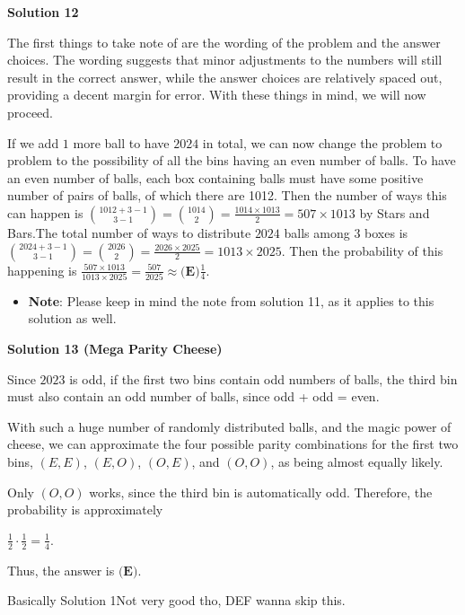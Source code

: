 \begin{enumerate}
 



\textbf{Solution 12}

The first things to take note of are the wording of the problem and the answer choices. The wording suggests that minor adjustments to the numbers will still result in the correct answer, while the answer choices are relatively spaced out, providing a decent margin for error. With these things in mind, we will now proceed.

 If we add $1$ more ball to have $2024$ in total, we can now change the problem to problem to the possibility of all the bins having an even number of balls. To have an even number of balls, each box containing balls must have some positive number of pairs of balls, of which there are 1012. Then the number of ways this can happen is $\binom{1012+3-1}{3-1}=\binom{1014}{2}=\frac{1014 \times 1013}{2}=507 \times 1013$ by Stars and Bars.The total number of ways to distribute $2024$ balls among $3$ boxes is $\binom{2024+3-1}{3-1}=\binom{2026}{2}=\frac{2026 \times 2025}{2}=1013 \times 2025$. Then the probability of this happening is $\frac{507 \times 1013}{1013 \times 2025}=\frac{507}{2025}\approx \boxed{\textbf{(E)} \frac{1}{4}}$.

 
            \begin{itemize}
        \item \textbf{Note}: Please keep in mind the note from solution 11, as it applies to this solution as well.
            \end{itemize}
            



\textbf{Solution 13 (Mega Parity Cheese)}

Since $2023$ is odd, if the first two bins contain odd numbers of balls, the third bin must also contain an odd number of balls, since odd + odd = even.

 With such a huge number of randomly distributed balls, and the magic power of cheese, we can approximate the four possible parity combinations for the first two bins, $(E,E)$, $(E,O)$, $(O,E)$, and $(O,O)$, as being almost equally likely.

 Only $(O,O)$ works, since the third bin is automatically odd. Therefore, the probability is approximately

 $\frac{1}{2}\cdot\frac{1}{2}=\boxed{\frac14}$.

 Thus, the answer is $\boxed{\textbf{(E)}}$.

 Basically Solution 1Not very good tho, DEF wanna skip this.


\end{enumerate}
